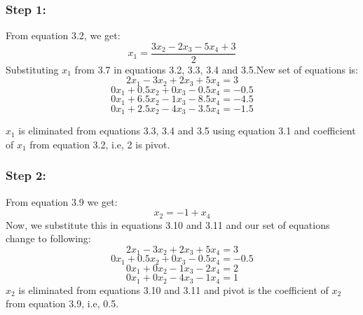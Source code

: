 \documentclass[12pt, oneside,table]{report}
\newcommand{\?}{\stackrel{?}{=}}
\theoremstyle{definition}
\begin{document}
\subsubsection{Step 1:}
From equation 3.2, we get:
\begin{equation}
  x_{1} = \frac{3x_{2}-2x_{3}-5x_{4}+3}{2}  
\end{equation}
Substituting $x_{1}$ from 3.7 in equations 3.2, 3.3, 3.4 and 3.5.New set of equations is:
\begin{equation}
    2x_{1}-3x_{2}+2x_{3}+5x_{4}=3
\end{equation}
\begin{equation}
    0x_{1}+0.5x_{2}+0x_{3}-0.5x_{4}=-0.5
\end{equation}
\begin{equation}
    0x_{1}+6.5x_{2}-1x_{3}-8.5x_{4}=-4.5
\end{equation}
\begin{equation}
    0x_{1}+2.5x_{2}-4x_{3}-3.5x_{4}=-1.5
\end{equation}

 $x_{1}$ is eliminated from equations 3.3, 3.4 and 3.5 using equation 3.1 and coefficient of $x_{1}$ from equation 3.2, i.e, 2 is pivot.
\subsubsection{Step 2:}
 From equation 3.9 we get:
\begin{equation}
     x_{2}=-1+x_{4}
\end{equation}
 Now, we substitute this in equations 3.10 and 3.11 and our set of equations change to following:
\begin{equation}
     2x_{1}-3x_{2}+2x_{3}+5x_{4}=3
\end{equation}
\begin{equation}
    0x_{1}+0.5x_{2}+0x_{3}-0.5x_{4}=-0.5
\end{equation}
\begin{equation}
    0x_{1}+0x_{2}-1x_{3}-2x_{4}=2
\end{equation}
\begin{equation}
    0x_{1}+0x_{2}-4x_{3}-1x_{4}=1
\end{equation}
 $x_{2}$ is eliminated from equations 3.10 and 3.11 and pivot is the coefficient of $x_{2}$ from equation 3.9, i.e, 0.5.
\end{document}
